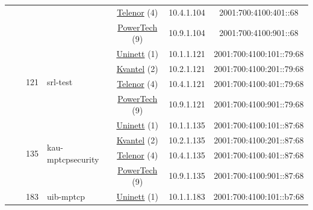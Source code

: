 \begin{small}
\begin{center}
\begin{longtable}{|c|c|c|c|c|c|c|c|}
  &  & \multicolumn{2}{|c|}{} & \multicolumn{2}{|c|}{\tiny{\href{https://www.telenor.no}{Telenor} (4)}} & \tiny{10.4.1.104} & \tiny{2001:700:4100:401::68} \\* \cline{5-5}\cline{6-6}\cline{7-7}\cline{8-8}
  &  & \multicolumn{2}{|c|}{} & \multicolumn{2}{|c|}{\tiny{\href{http://www.powertech.no}{PowerTech} (9)}} & \tiny{10.9.1.104} & \tiny{2001:700:4100:901::68} \\* \cline{3-3}\cline{4-4}\cline{5-5}\cline{6-6}\cline{7-7}\cline{8-8}
  &  & \multirow{4}{*}{\tiny{121}} & \multicolumn{1}{|l|}{\multirow{4}{*}{\tiny{srl-test}}} & \multicolumn{2}{|c|}{\tiny{\href{https://www.uninett.no}{Uninett} (1)}} & \tiny{10.1.1.121} & \tiny{2001:700:4100:101::79:68} \\* \cline{5-5}\cline{6-6}\cline{7-7}\cline{8-8}
  &  &  &  & \multicolumn{2}{|c|}{\tiny{\href{http://kvantel.no}{Kvantel} (2)}} & \tiny{10.2.1.121} & \tiny{2001:700:4100:201::79:68} \\* \cline{5-5}\cline{6-6}\cline{7-7}\cline{8-8}
  &  &  &  & \multicolumn{2}{|c|}{\tiny{\href{https://www.telenor.no}{Telenor} (4)}} & \tiny{10.4.1.121} & \tiny{2001:700:4100:401::79:68} \\* \cline{5-5}\cline{6-6}\cline{7-7}\cline{8-8}
  &  &  &  & \multicolumn{2}{|c|}{\tiny{\href{http://www.powertech.no}{PowerTech} (9)}} & \tiny{10.9.1.121} & \tiny{2001:700:4100:901::79:68} \\* \cline{3-3}\cline{4-4}\cline{5-5}\cline{6-6}\cline{7-7}\cline{8-8}
  &  & \multirow{4}{*}{\tiny{135}} & \multicolumn{1}{|l|}{\multirow{4}{*}{\tiny{kau-mptcpsecurity}}} & \multicolumn{2}{|c|}{\tiny{\href{https://www.uninett.no}{Uninett} (1)}} & \tiny{10.1.1.135} & \tiny{2001:700:4100:101::87:68} \\* \cline{5-5}\cline{6-6}\cline{7-7}\cline{8-8}
  &  &  &  & \multicolumn{2}{|c|}{\tiny{\href{http://kvantel.no}{Kvantel} (2)}} & \tiny{10.2.1.135} & \tiny{2001:700:4100:201::87:68} \\* \cline{5-5}\cline{6-6}\cline{7-7}\cline{8-8}
  &  &  &  & \multicolumn{2}{|c|}{\tiny{\href{https://www.telenor.no}{Telenor} (4)}} & \tiny{10.4.1.135} & \tiny{2001:700:4100:401::87:68} \\* \cline{5-5}\cline{6-6}\cline{7-7}\cline{8-8}
  &  &  &  & \multicolumn{2}{|c|}{\tiny{\href{http://www.powertech.no}{PowerTech} (9)}} & \tiny{10.9.1.135} & \tiny{2001:700:4100:901::87:68} \\* \cline{3-3}\cline{4-4}\cline{5-5}\cline{6-6}\cline{7-7}\cline{8-8}
  &  & \multirow{4}{*}{\tiny{183}} & \multicolumn{1}{|l|}{\multirow{4}{*}{\tiny{uib-mptcp}}} & \multicolumn{2}{|c|}{\tiny{\href{https://www.uninett.no}{Uninett} (1)}} & \tiny{10.1.1.183} & \tiny{2001:700:4100:101::b7:68} \\* \cline{5-5}\cline{6-6}\cline{7-7}\cline{8-8}

\end{longtable}
\end{center}
\end{small}
